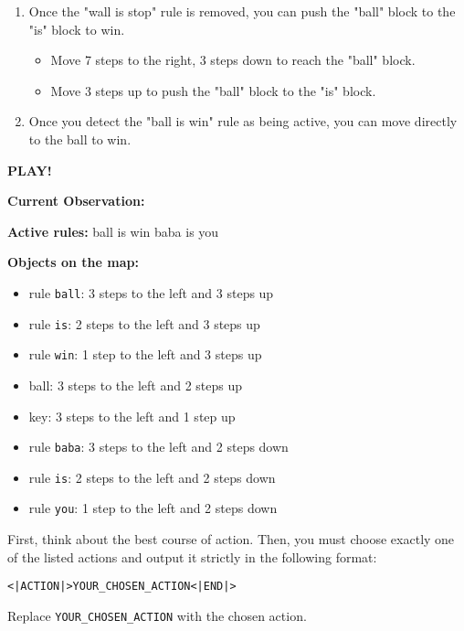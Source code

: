 \begin{GreenBox}
\begin{enumerate}
		\item Once the "wall is stop" rule is removed, you can push the "ball" block
			to the "is" block to win.
			\begin{itemize}
				\item Move 7 steps to the right, 3 steps down to reach the "ball" block.

				\item Move 3 steps up to push the "ball" block to the "is" block.
			\end{itemize}

		\item Once you detect the "ball is win" rule as being active, you can move
			directly to the ball to win.
	\end{enumerate}

	\textbf{PLAY!}

	\textbf{Current Observation:}

	\textbf{Active rules:} ball is win baba is you

	\textbf{Objects on the map:}
	\begin{itemize}
		\item rule \texttt{ball}: 3 steps to the left and 3 steps up

		\item rule \texttt{is}: 2 steps to the left and 3 steps up

		\item rule \texttt{win}: 1 step to the left and 3 steps up

		\item ball: 3 steps to the left and 2 steps up

		\item key: 3 steps to the left and 1 step up

		\item rule \texttt{baba}: 3 steps to the left and 2 steps down

		\item rule \texttt{is}: 2 steps to the left and 2 steps down

		\item rule \texttt{you}: 1 step to the left and 2 steps down
	\end{itemize}

	First, think about the best course of action. Then, you must choose exactly one
	of the listed actions and output it strictly in the following format:

	\texttt{<|ACTION|>YOUR\_CHOSEN\_ACTION<|END|>}

	Replace \texttt{YOUR\_CHOSEN\_ACTION} with the chosen action.
\end{GreenBox}
\newpage


